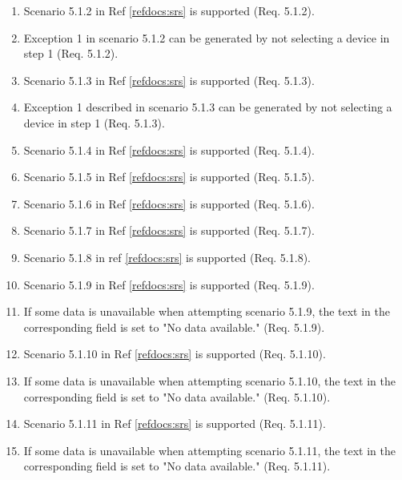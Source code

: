 \documentclass[a4paper]{article}
\newlength{\testlabellength}
\newenvironment{testlist}{\begin{enumerate}[label=\bfseries Test \thesubsection.\arabic* , labelindent=0pt, labelwidth=\testlabellength , leftmargin=2cm]}{\end{enumerate}}
\begin{document}
\begin{appendices}
\begin{testlist}
	\item Scenario 5.1.2 in Ref \ref{refdocs:srs} is supported (Req. 5.1.2).
	
	\item Exception 1 in scenario 5.1.2 can be generated by not selecting a device in step 1 (Req. 5.1.2).
	
	\item Scenario 5.1.3 in Ref \ref{refdocs:srs} is supported (Req. 5.1.3).
	
	\item Exception 1 described in scenario 5.1.3 can be generated by not selecting a device in step 1 (Req. 5.1.3). 
	
	\item Scenario 5.1.4 in Ref \ref{refdocs:srs} is supported (Req. 5.1.4).
	
	\item Scenario 5.1.5 in Ref \ref{refdocs:srs} is supported (Req. 5.1.5).
	
	\item Scenario 5.1.6 in Ref \ref{refdocs:srs} is supported (Req. 5.1.6).
	
	\item Scenario 5.1.7 in Ref \ref{refdocs:srs} is supported (Req. 5.1.7).
	
	\item Scenario 5.1.8 in ref \ref{refdocs:srs} is supported (Req. 5.1.8).
	
	\item Scenario 5.1.9 in Ref \ref{refdocs:srs} is supported (Req. 5.1.9).
	
	\item If some data is unavailable when attempting scenario 5.1.9, the text in the corresponding field is set to "No data available." (Req. 5.1.9).
	
	\item Scenario 5.1.10 in Ref \ref{refdocs:srs} is supported (Req. 5.1.10).
	
	\item If some data is unavailable when attempting scenario 5.1.10, the text in the corresponding field is set to "No data available." (Req. 5.1.10).
	
	\item Scenario 5.1.11 in Ref \ref{refdocs:srs} is supported (Req. 5.1.11).
	
	\item If some data is unavailable when attempting scenario 5.1.11, the text in the corresponding field is set to "No data available." (Req. 5.1.11).
	

\end{testlist}
\end{appendices}
\end{document}
